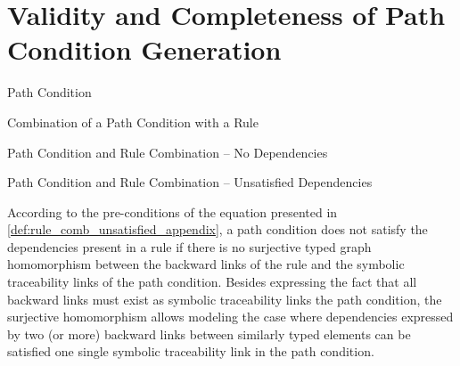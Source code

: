 \section{Validity and Completeness of Path Condition Generation}
\label{sec:val_complete_path_cond_gen}
\setcounter{proposition}{0}
\setcounter{lemma}{0}
\setcounter{equation}{0}

\onehalfspacing 

\begin{definition}{Path Condition\\}
\label{def:path_condition_appendix}
\end{definition}


\begin{definition}{Combination of a Path Condition with a Rule}
\label{def:combine_pc_with_rule_appendix}
\end{definition}


\begin{definition}{Path Condition and Rule Combination -- No Dependencies\\}
\label{def:rule_comb_no_dependencies_appendix}
\end{definition}


\begin{definition}{Path Condition and Rule Combination -- Unsatisfied Dependencies\\} 
\label{def:rule_comb_unsatisfied_appendix}
\end{definition}

According to the pre-conditions of the equation presented in \cref{def:rule_comb_unsatisfied_appendix}, a path condition does not satisfy the dependencies present in a rule if there is no surjective typed graph homomorphism between the backward links of the rule and the symbolic traceability links of the path condition. Besides expressing the fact that all backward links must exist as symbolic traceability links the path condition, the surjective homomorphism allows modeling the case where dependencies expressed by two (or more) backward links between similarly typed elements can be satisfied one single symbolic traceability link in the path condition. 

